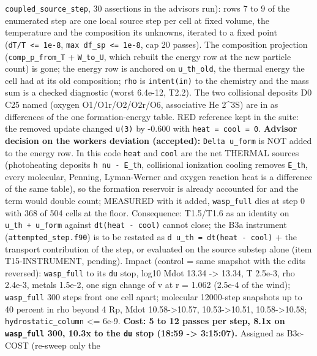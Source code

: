\documentclass[english,a4paper]{my_memo}
\begin{document}
\begin{itemize}
  \texttt{coupled\_source\_step}, 30 assertions in the advisor\textquotesingle s run): rows 7 to 9 of
  the enumerated step are one local source step per cell at fixed volume,
  the temperature and the composition its unknowns, iterated to a fixed
  point (\texttt{\textbar{}dT\textbar{}/T\ \textless{}=\ 1e-8}, \texttt{max\ \textbar{}df\_sp\textbar{}\ \textless{}=\ 1e-8}, cap 20 passes). The
  composition projection (\texttt{comp\_p\_from\_T} + \texttt{W\_to\_U}, which rebuilt the
  energy row at the new particle count) is gone; the energy row is anchored
  on \texttt{u\_th\_old}, the thermal energy the cell had at its old composition;
  \texttt{rho} is \texttt{intent(in)} to the chemistry and the mass sum is a checked
  diagnostic (worst 6.4e-12, T2.2). The two collisional deposits D0 C25
  named (oxygen O1/O1r/O2/O2r/O6, associative He 2\^{}3S) are in as differences
  of the one formation-energy table. RED reference kept in the suite: the
  removed update changed \texttt{u(3)} by -0.600 with \texttt{heat\ =\ cool\ =\ 0}.
  \textbf{Advisor decision on the worker\textquotesingle s deviation (accepted):} \texttt{Delta\ u\_form}
  is NOT added to the energy row. In this code \texttt{heat} and \texttt{cool} are the net
  THERMAL sources (photoheating deposits \texttt{h\ nu\ -\ E\_th}, collisional
  ionization cooling removes \texttt{E\_th}, every molecular, Penning, Lyman-Werner
  and oxygen reaction heat is a difference of the same table), so the
  formation reservoir is already accounted for and the term would double
  count; MEASURED with it added, \texttt{wasp\_full} dies at step 0 with 368 of 504
  cells at the floor. Consequence: T1.5/T1.6 as an identity on
  \texttt{u\_th\ +\ u\_form} against \texttt{dt(heat\ -\ cool)} cannot close; the B3a instrument
  (\texttt{attempted\_step.f90}) is to be restated as \texttt{d\ u\_th\ =\ dt(heat\ -\ cool)} +
  the transport contribution of the step, or evaluated on the source substep
  alone (item T15-INSTRUMENT, pending). Impact (control = same snapshot with
  the edits reversed): \texttt{wasp\_full} to its \texttt{du} stop, log10 Mdot 13.34 -\textgreater{}
  13.34, T 2.5e-3, rho 2.4e-3, metals 1.5e-2, one sign change of v at r =
  1.062 (2.5e-4 of the wind); \texttt{wasp\_full} 300 steps front one cell apart;
  molecular 12000-step snapshots up to 40 percent in rho beyond 4 Rp, Mdot
  10.58-\textgreater10.57, 10.53-\textgreater10.51, 10.58-\textgreater10.58; \texttt{hydrostatic\_column} \textless= 6e-9.
  \textbf{Cost: 5 to 12 passes per step, 8.1x on \texttt{wasp\_full} 300, 10.3x to the
  \texttt{du} stop (18:59 -\textgreater{} 3:15:07).} Assigned as B3c-COST (re-sweep only the

\end{itemize}
\end{document}
